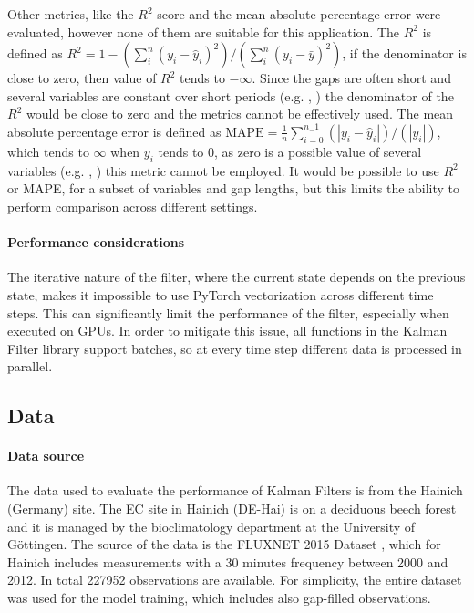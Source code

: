 \documentclass{article}
\let\Oldsubsection\subsection
\renewcommand{\subsection}{\FloatBarrier\Oldsubsection}
\begin{document}
Other metrics, like the $R^2$ score and the mean absolute percentage error were evaluated, however none of them are suitable for this application. The $R^2$ is defined as $R^2 = 1 - (\sum_{i}^{n} (y_i - \hat{y}_i)^2)/(\sum_{i}^{n} (y_i - \bar{y})^2)$, if the denominator is close to zero, then value of $R^2$ tends to $- \infty$. Since the gaps are often short and several variables are constant over short periods (e.g. , ) the denominator of the $R^2$ would be close to zero and the metrics cannot be effectively used. The mean absolute percentage error is defined as $\text{MAPE} = \frac{1}{n} \sum_{i=0}^{n_-1} (\left| y_i - \hat{y}_i \right|)/(\left| y_i \right|)$, which tends to $\infty$ when $y_i$ tends to 0, as zero is a possible value of several variables (e.g. , ) this metric cannot be employed.
It would be possible to use $R^2$ or MAPE, for a subset of variables and gap lengths, but this limits the ability to perform comparison across different settings. 

\paragraph{Performance considerations} 

The iterative nature of the filter, where the current state depends on the previous state, makes it impossible to use \textsf{PyTorch} vectorization across different time steps. This can significantly limit the performance of the filter, especially when executed on GPUs. In order to  mitigate this issue, all functions in the Kalman Filter library support batches, so at every time step different data is processed in parallel.


\subsection{Data}

\paragraph{Data source} The data used to evaluate the performance of Kalman Filters is from the Hainich (Germany) site. The EC site in Hainich (DE-Hai) is on a deciduous beech forest and it is managed by the bioclimatology department at the  University of Göttingen. The source of the data is  the FLUXNET 2015 Dataset \cite{pastorello_fluxnet2015_2020}, which for Hainich includes measurements with a 30 minutes frequency between 2000 and 2012. In total 227952 observations are available. For simplicity, the entire dataset was used for the model training, which includes also gap-filled observations.
\end{document}
